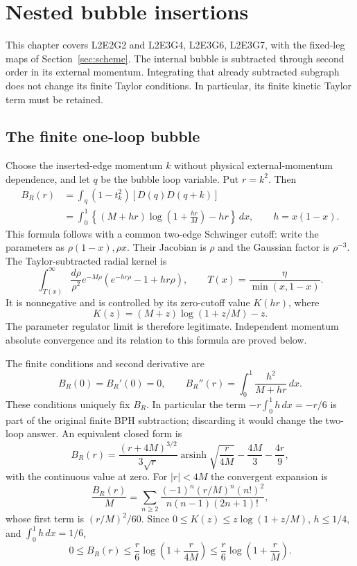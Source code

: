 \section{Nested bubble insertions}
\label{sec:nested-bubble}

This chapter covers L2E2G2 and L2E3G4, L2E3G6, L2E3G7, with the fixed-leg
maps of Section~\ref{sec:scheme}. The internal bubble is subtracted through
second order in its external momentum. Integrating that already subtracted
subgraph does not change its finite Taylor conditions. In particular, its
finite kinetic Taylor term must be retained.

\subsection{The finite one-loop bubble}

Choose the inserted-edge momentum $k$ without physical external-momentum
dependence, and let $q$ be the bubble loop variable. Put $r=k^2$. Then
\begin{align*}
 B_R(r)&=\int_q(1-t_k^2)[D(q)D(q+k)]\\
 &=\int_0^1\left\{(M+hr)\log\left(1+\frac{hr}{M}\right)-hr\right\}\,dx,
 \qquad h=x(1-x).
\end{align*}
This formula follows with a common two-edge Schwinger cutoff: write the
parameters as $\rho(1-x),\rho x$. Their Jacobian is $\rho$ and the
Gaussian factor is $\rho^{-3}$. The Taylor-subtracted radial kernel is
\[
 \int_{T(x)}^\infty\frac{d\rho}{\rho^2}e^{-M\rho}
       (e^{-hr\rho}-1+hr\rho),\qquad
 T(x)=\frac{\eta}{\min(x,1-x)}.
\]
It is nonnegative and is controlled by its zero-cutoff value
$K(hr)$, where
\[
 K(z)=(M+z)\log(1+z/M)-z.
\]
The parameter regulator limit is therefore legitimate. Independent momentum
absolute convergence and its relation to this formula are proved below.

The finite conditions and second derivative are
\[
 B_R(0)=B_R'(0)=0,\qquad
 B_R''(r)=\int_0^1\frac{h^2}{M+hr}\,dx.
\]
These conditions uniquely fix $B_R$. In particular the term
$-r\int_0^1h\,dx=-r/6$ is part of the original finite BPH subtraction;
discarding it would change the two-loop answer. An equivalent closed form is
\[
 B_R(r)=\frac{(r+4M)^{3/2}}{3\sqrt r}
            \operatorname{arsinh}\sqrt{\frac r{4M}}
                -\frac{4M}{3}-\frac{4r}{9},
\]
with the continuous value at zero. For $|r|<4M$ the convergent expansion is
\[
 \frac{B_R(r)}M=
 \sum_{n\ge2}\frac{(-1)^n(r/M)^n(n!)^2}
                         {n(n-1)(2n+1)!},
\]
whose first term is $(r/M)^2/60$. Since
$0\le K(z)\le z\log(1+z/M)$, $h\le1/4$, and $\int_0^1h\,dx=1/6$,
\[
 0\le B_R(r)\le\frac r6\log\left(1+\frac r{4M}\right)
                    \le\frac r6\log\left(1+\frac rM\right).
\]

